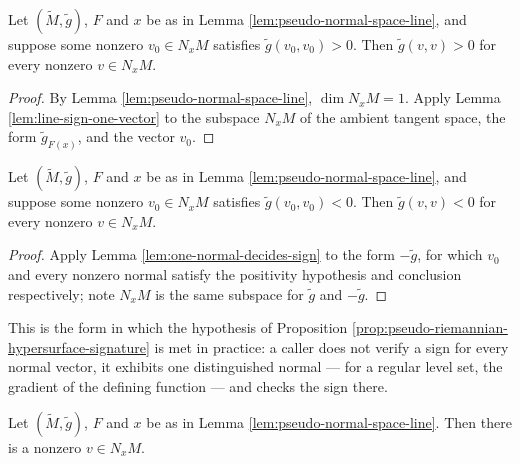 \begin{lemma}
\label{lem:one-normal-decides-sign}
\leanok
{}
Let $(\tilde{M},\tilde{g})$, $F$ and $x$ be as in Lemma \ref{lem:pseudo-normal-space-line}, and
suppose some nonzero $v_0 \in N_xM$ satisfies $\tilde{g}(v_0,v_0) > 0$. Then
$\tilde{g}(v,v) > 0$ for every nonzero $v \in N_xM$.
\end{lemma}

\begin{proof}
\leanok
{}
By Lemma \ref{lem:pseudo-normal-space-line}, $\dim N_xM = 1$. Apply Lemma
\ref{lem:line-sign-one-vector} to the subspace $N_xM$ of the ambient tangent space, the form
$\tilde{g}_{F(x)}$, and the vector $v_0$.
\end{proof}

\begin{lemma}
\label{lem:one-normal-decides-sign-neg}
\leanok
{}
Let $(\tilde{M},\tilde{g})$, $F$ and $x$ be as in Lemma \ref{lem:pseudo-normal-space-line}, and
suppose some nonzero $v_0 \in N_xM$ satisfies $\tilde{g}(v_0,v_0) < 0$. Then
$\tilde{g}(v,v) < 0$ for every nonzero $v \in N_xM$.
\end{lemma}

\begin{proof}
\leanok
{}
Apply Lemma \ref{lem:one-normal-decides-sign} to the form $-\tilde{g}$, for which $v_0$ and every
nonzero normal satisfy the positivity hypothesis and conclusion respectively; note $N_xM$ is the
same subspace for $\tilde{g}$ and $-\tilde{g}$.
\end{proof}

This is the form in which the hypothesis of Proposition
\ref{prop:pseudo-riemannian-hypersurface-signature} is met in practice: a caller does not verify a
sign for every normal vector, it exhibits one distinguished normal — for a regular level set, the
gradient of the defining function — and checks the sign there.

\begin{lemma}
\label{lem:exists-nonzero-normal}
\leanok
{}
Let $(\tilde{M},\tilde{g})$, $F$ and $x$ be as in Lemma \ref{lem:pseudo-normal-space-line}. Then there is a nonzero $v \in N_xM$.
\end{lemma}

